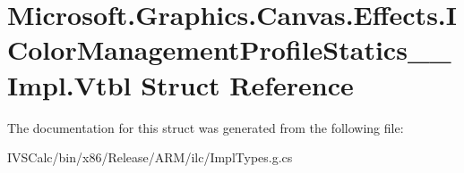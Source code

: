 \hypertarget{struct_microsoft_1_1_graphics_1_1_canvas_1_1_effects_1_1_i_color_management_profile_statics_____impl_1_1_vtbl}{}\section{Microsoft.\+Graphics.\+Canvas.\+Effects.\+I\+Color\+Management\+Profile\+Statics\+\_\+\+\_\+\+Impl.\+Vtbl Struct Reference}
\label{struct_microsoft_1_1_graphics_1_1_canvas_1_1_effects_1_1_i_color_management_profile_statics_____impl_1_1_vtbl}


The documentation for this struct was generated from the following file\+:\begin{DoxyCompactItemize}
\item 
I\+V\+S\+Calc/bin/x86/\+Release/\+A\+R\+M/ilc/Impl\+Types.\+g.\+cs\end{DoxyCompactItemize}

